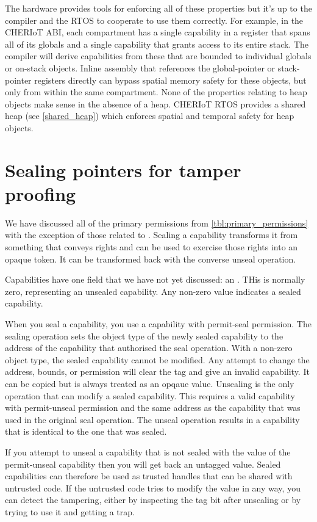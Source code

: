 The hardware provides tools for enforcing all of these properties but it's up to the compiler and the RTOS to cooperate to use them correctly.
For example, in the CHERIoT ABI, each compartment has a single capability in a register that spans all of its globals and a single capability that grants access to its entire stack.
The compiler will derive capabilities from these that are bounded to individual globals or on-stack objects.
Inline assembly that references the global-pointer or stack-pointer registers directly can bypass spatial memory safety for these objects, but only from within the same compartment.
None of the properties relating to heap objects make sense in the absence of a heap.
CHERIoT RTOS provides a shared heap (see \ref{shared_heap}) which enforces spatial and temporal safety for heap objects.

\section[label=sealing_intro]{Sealing pointers for tamper proofing}

We have discussed all of the primary permissions from \ref{tbl:primary_permissions} with the exception of those related to .
Sealing a capability transforms it from something that conveys rights and can be used to exercise those rights into an opaque token.
It can be transformed back with the converse unseal operation.

Capabilities have one field that we have not yet discussed: an .
THis is normally zero, representing an unsealed capability.
Any non-zero value indicates a sealed capability.

When you seal a capability, you use a capability with permit-seal permission.
The sealing operation sets the object type of the newly sealed capability to the address of the capability that authorised the seal operation.
With a non-zero object type, the sealed capability cannot be modified.
Any attempt to change the address, bounds, or permission will clear the tag and give an invalid capability.
It can be copied but is always treated as an opqaue value.
Unsealing is the only operation that can modify a sealed capability.
This requires a valid capability with permit-unseal permission and the same address as the capability that was used in the original seal operation.
The unseal operation results in a capability that is identical to the one that was sealed.

If you attempt to unseal a capability that is not sealed with the value of the permit-unseal capability then you will get back an untagged value.
Sealed capabilities can therefore be used as trusted handles that can be shared with untrusted code.
If the untrusted code tries to modify the value in any way, you can detect the tampering, either by inspecting the tag bit after unsealing or by trying to use it and getting a trap.

